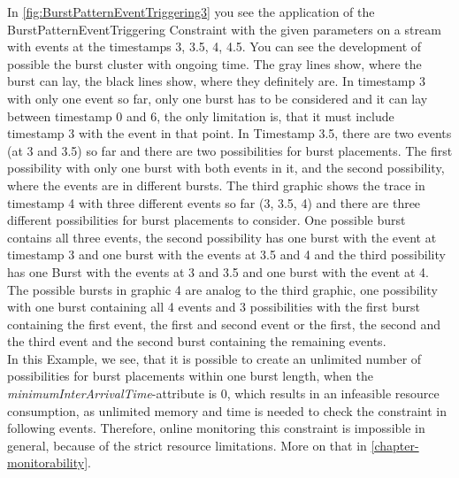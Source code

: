 In \ref{fig:BurstPatternEventTriggering3} you see the application of the BurstPatternEventTriggering Constraint with the given parameters on a stream with events at the timestamps 3, 3.5, 4, 4.5. You can see the development of possible the burst cluster with ongoing time. The gray lines show, where the burst can lay, the black lines show, where they definitely are. In timestamp 3 with only one event so far, only one burst has to be considered and it can lay between timestamp 0 and 6, the only limitation is, that it must include timestamp 3 with the event in that point. In Timestamp 3.5, there are two events (at 3 and 3.5) so far and there are two possibilities for burst placements. The first possibility with only one burst with both events in it, and the second possibility, where the events are in different bursts. The third graphic shows the trace in timestamp 4 with three different events so far (3, 3.5, 4) and there are three different possibilities for burst placements to consider. One possible burst contains all three events, the second possibility has one burst with the event at timestamp 3 and one burst with the events at 3.5 and 4 and the third possibility has one Burst with the events at 3 and 3.5 and one burst with the event at 4. The possible bursts in graphic 4 are analog to the third graphic, one possibility with one burst containing all 4 events and 3 possibilities with the first burst containing the first event, the first and second event or the first, the second and the third event and the second burst containing the remaining events.\\
In this Example, we see, that it is possible to create an unlimited number of possibilities for burst placements within one burst length, when the \textit{minimumInterArrivalTime}-attribute is 0, which results in an infeasible resource consumption, as unlimited memory and time is needed to check the constraint in following events. Therefore, online monitoring this constraint is impossible in general, because of the strict resource limitations. More on that in \ref{chapter-monitorability}.

